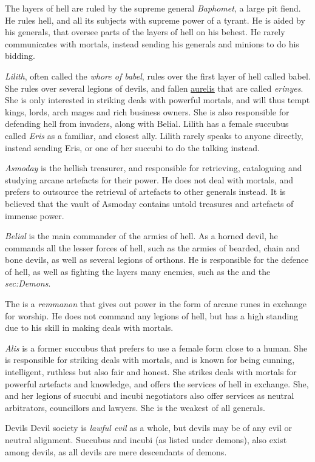 The layers of hell are ruled by the supreme general \emph{Baphomet}, a large
pit fiend. He rules hell, and all its subjects with supreme power of a
tyrant. He is aided by his generals, that oversee parts of the layers of
hell on his behest. He rarely communicates with mortals, instead sending his
generals and minions to do his bidding.

\emph{Lilith}, often called the \emph{whore of babel}, rules over the first
layer of hell called babel. She rules over several legions of devils, and
fallen \hyperref[sec:Aurelis]{aurelis} that are called \emph{erinyes}. She is
only interested in striking deals with powerful mortals, and will thus tempt
kings, lords, arch mages and rich business owners. She is also responsible for
defending hell from invaders, along with Belial. Lilith has a female succubus
called \emph{Eris} as a familiar, and closest ally. Lilith rarely speaks to
anyone directly, instead sending Eris, or one of her succubi to do the talking
instead.

\emph{Asmoday} is the hellish treasurer, and responsible for retrieving,
cataloguing and studying arcane artefacts for their power. He does not deal
with mortals, and prefers to outsource the retrieval of artefacts to other
generals instead. It is believed that the vault of Asmoday contains untold
treasures and artefacts of immense power.

\emph{Belial} is the main commander of the armies of hell. As a horned devil,
he commands all the lesser forces of hell, such as the armies of bearded,
chain and bone devils, as well as several legions of orthons. He is
responsible for the defence of hell, as well as fighting the layers many
enemies, such as the  and the \emph{sec:Demons}.

The  is a \emph{remmanon} that gives out power in the
form of arcane runes in exchange for worship. He does not command any legions
of hell, but has a high standing due to his skill in making deals with mortals.

\emph{Alis} is a former succubus that prefers to use a female form close to a
human. She is responsible for striking deals with mortals, and is known for
being cunning, intelligent, ruthless but also fair and honest. She strikes
deals with mortals for powerful artefacts and knowledge, and offers the
services of hell in exchange. She, and her legions of succubi and incubi
negotiators also offer services as neutral arbitrators, councillors and
lawyers. She is the weakest of all generals.

\begin{35e}{Devils}
  Devil society is \emph{lawful evil} as a whole, but devils may be of any
  evil or neutral alignment. Succubus and incubi (as listed under demons),
  also exist among devils, as all devils are mere descendants of demons.
\end{35e}
